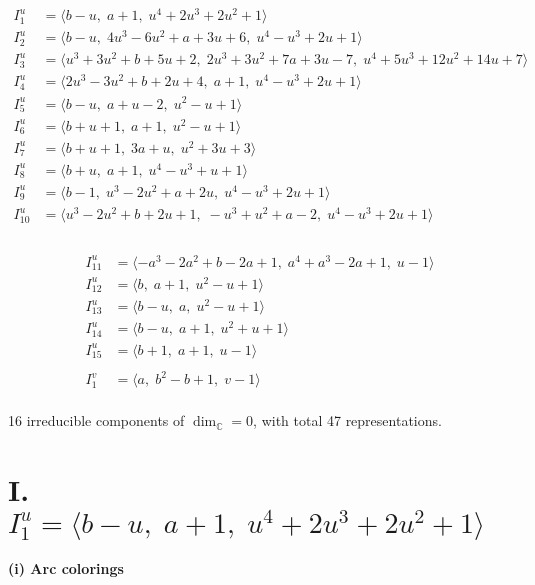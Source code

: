 \documentclass[1p]{elsarticle_modified}
\theoremstyle{definition}
\begin{document}
\begin{align*}
I^u_{1}&=\langle 
b- u,\;a+1,\;u^4+2 u^3+2 u^2+1\rangle \\
I^u_{2}&=\langle 
b- u,\;4 u^3-6 u^2+a+3 u+6,\;u^4- u^3+2 u+1\rangle \\
I^u_{3}&=\langle 
u^3+3 u^2+b+5 u+2,\;2 u^3+3 u^2+7 a+3 u-7,\;u^4+5 u^3+12 u^2+14 u+7\rangle \\
I^u_{4}&=\langle 
2 u^3-3 u^2+b+2 u+4,\;a+1,\;u^4- u^3+2 u+1\rangle \\
I^u_{5}&=\langle 
b- u,\;a+u-2,\;u^2- u+1\rangle \\
I^u_{6}&=\langle 
b+u+1,\;a+1,\;u^2- u+1\rangle \\
I^u_{7}&=\langle 
b+u+1,\;3 a+u,\;u^2+3 u+3\rangle \\
I^u_{8}&=\langle 
b+u,\;a+1,\;u^4- u^3+u+1\rangle \\
I^u_{9}&=\langle 
b-1,\;u^3-2 u^2+a+2 u,\;u^4- u^3+2 u+1\rangle \\
I^u_{10}&=\langle 
u^3-2 u^2+b+2 u+1,\;- u^3+u^2+a-2,\;u^4- u^3+2 u+1\rangle \\
\end{align*}\\
\begin{align*}
I^u_{11}&=\langle 
- a^3-2 a^2+b-2 a+1,\;a^4+a^3-2 a+1,\;u-1\rangle \\
I^u_{12}&=\langle 
b,\;a+1,\;u^2- u+1\rangle \\
I^u_{13}&=\langle 
b- u,\;a,\;u^2- u+1\rangle \\
I^u_{14}&=\langle 
b- u,\;a+1,\;u^2+u+1\rangle \\
I^u_{15}&=\langle 
b+1,\;a+1,\;u-1\rangle \\
\\
I^v_{1}&=\langle 
a,\;b^2- b+1,\;v-1\rangle \\
\end{align*}
\raggedright * 16 irreducible components of $\dim_{\mathbb{C}}=0$, with total 47 representations.\\
\newpage
\renewcommand{\arraystretch}{1}
\centering \section*{I. $I^u_{1}= \langle b- u,\;a+1,\;u^4+2 u^3+2 u^2+1 \rangle$}
\flushleft \textbf{(i) Arc colorings}\\
\end{document}
